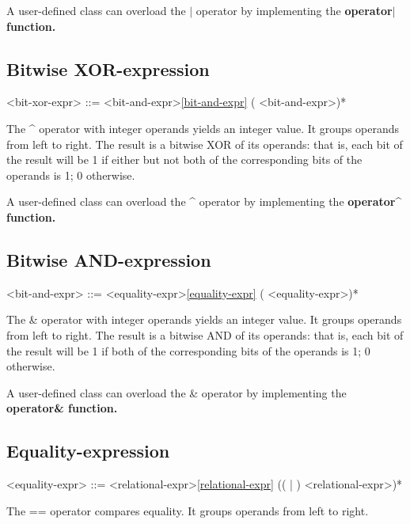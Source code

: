 \documentclass[a4paper,oneside,11pt]{article}
\begin{document}
A user-defined class can overload the $|$ operator by implementing the \bf{operator$|$} function.

\subsection{Bitwise XOR-expression}

\begin{grammar}
\label{bit-xor-expr}<bit-xor-expr> ::= <bit-and-expr>\ref{bit-and-expr} (\lit*{\^} <bit-and-expr>)*
\end{grammar}

The \^{} operator with integer operands yields an integer value. It groups operands from left to right.
The result is a bitwise XOR of its operands:
that is, each bit of the result will be 1 if either but not both of the corresponding bits of the operands is 1; 0 otherwise.

A user-defined class can overload the \^{} operator by implementing the \bf{operator\^{}} function.

\subsection{Bitwise AND-expression}

\begin{grammar}
\label{bit-and-expr}<bit-and-expr> ::= <equality-expr>\ref{equality-expr} (\lit*{\&} <equality-expr>)*
\end{grammar}

The \& operator with integer operands yields an integer value. It groups operands from left to right.
The result is a bitwise AND of its operands:
that is, each bit of the result will be 1 if both of the corresponding bits of the operands is 1; 0 otherwise.

A user-defined class can overload the \& operator by implementing the \bf{operator\&} function.

\subsection{Equality-expression}

\begin{grammar}
\label{equality-expr}<equality-expr> ::= <relational-expr>\ref{relational-expr} ((\lit*{==} | \lit*{!=}) <relational-expr>)*
\end{grammar}

The == operator compares equality. It groups operands from left to right.
\end{document}
